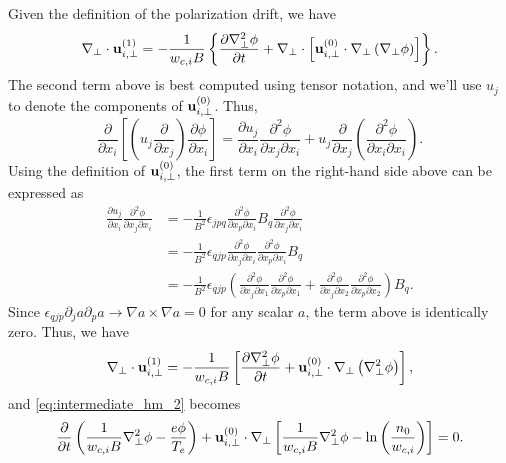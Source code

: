 \documentclass[oneside,a4paper,11pt]{report}
\begin{document}
Given the definition of the polarization drift, we have
\begin{equation}
    \nabla_\perp \cdot \mathbf{u}_{i,\perp}^{(1)} = -\frac{1}{w_{c,i} B} \left \{ \frac{\partial \nabla_\perp^2 \phi}{\partial t} + \nabla_\perp \cdot \left [ \mathbf{u}_{i,\perp}^{(0)} \cdot \nabla_\perp \left ( \nabla_\perp \phi \right ) \right ] \right \}.
\end{equation}
The second term above is best computed using tensor notation, and we'll use $u_j$ to denote the components of $\mathbf{u}_{i,\perp}^{(0)}$. Thus,
\begin{equation}
    \frac{\partial}{\partial x_i} \left [ \left ( u_j \frac{\partial}{\partial x_j} \right) \frac{\partial \phi}{\partial x_i} \right ] = \frac{\partial u_j}{\partial x_i} \frac{\partial^2 \phi}{\partial x_j \partial x_i} + u_j \frac{\partial}{\partial x_j} \left (\frac{\partial^2 \phi}{\partial x_i \partial x_i} \right ).
\end{equation}
Using the definition of $\mathbf{u}_{i,\perp}^{(0)}$, the first term on the right-hand side above can be expressed as
\begin{align}
    \frac{\partial u_j}{\partial x_i} \frac{\partial^2 \phi}{\partial x_j \partial x_i} &= -\frac{1}{B^2} \epsilon_{jpq} \frac{\partial^2 \phi}{\partial x_p \partial x_i} B_q \frac{\partial^2 \phi}{\partial x_j \partial x_i} \nonumber \\
    &= -\frac{1}{B^2} \epsilon_{qjp} \frac{\partial^2 \phi}{\partial x_j \partial x_i} \frac{\partial^2 \phi}{\partial x_p \partial x_i} B_q  \nonumber \\
    &= -\frac{1}{B^2} \epsilon_{qjp} \left ( \frac{\partial^2 \phi}{\partial x_j \partial x_1} \frac{\partial^2 \phi}{\partial x_p \partial x_1} + \frac{\partial^2 \phi}{\partial x_j \partial x_2} \frac{\partial^2 \phi}{\partial x_p \partial x_2}  \right ) B_q.
\end{align}
Since $\epsilon_{qjp} \partial_j a \partial_p a \to \nabla a \times \nabla a = 0$ for any scalar $a$, the term above is identically zero. Thus, we have
\begin{equation}
    \label{eq:hm_divergence_polarization}
    \nabla_\perp \cdot \mathbf{u}_{i,\perp}^{(1)} = -\frac{1}{w_{c,i} B} \left [ \frac{\partial \nabla_\perp^2 \phi}{\partial t} + \mathbf{u}_{i,\perp}^{(0)} \cdot \nabla_\perp \left ( \nabla_\perp^2 \phi \right ) \right ],
\end{equation}
and \cref{eq:intermediate_hm_2} becomes
\begin{equation}
   \frac{\partial}{\partial t}\left ( \frac{1}{w_{c,i} B}\nabla_\perp^2 \phi - \frac{e \phi}{T_e} \right ) + \mathbf{u}_{i,\perp}^{(0)} \cdot \nabla_\perp \left [ \frac{1}{w_{c,i} B} \nabla_\perp^2 \phi - \ln \left( \frac{n_0}{w_{c,i}} \right) \right] = 0.
\end{equation}
\end{document}
